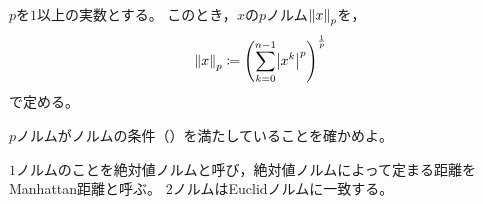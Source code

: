 \documentclass[b5paper,draft]{ltjsbook}
\begin{document}
\begin{defi}[$p$ノルム]
    $p$を$1$以上の実数とする。
    このとき，$x$の$p$ノルム$\norm{x}_p$を，
    \begin{equation}
        \norm{x}_p \coloneqq \pare{\sum_{k=0}^{n-1} \abs{x^k}^p}^{\frac{1}{p}}
    \end{equation}
    で定める。
\end{defi}

\begin{prob}
    $p$ノルムがノルムの条件（）を満たしていることを確かめよ。
\end{prob}

$1$ノルムのことを絶対値ノルムと呼び，絶対値ノルムによって定まる距離をManhattan距離と呼ぶ。
$2$ノルムはEuclidノルムに一致する。
\end{document}
